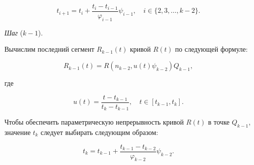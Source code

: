 $$
t_{i+1}=t_i+\frac{t_i-t_{i-1}}{\varphi_{i-1}}\psi_{i-1}, \quad i \in \{2,3,\dots,k-2\}.
$$

\bigskip
\textit{Шаг} ($k-1$).

Вычислим последний сегмент $R_{k-1}(t)$ кривой $R(t)$ по следующей формуле:

$$
R_{k-1}(t)=R(n_{k-2},u(t)\psi_{k-2})Q_{k-1},
$$

\noindent где

$$
u(t)=\frac{t-t_{k-1}}{t_k-t_{k-1}}, \quad t \in [t_{k-1},t_k].
$$

Чтобы обеспечить параметрическую непрерывность кривой $R(t)$ в точке $Q_{k-1}$, значение $t_k$ следует выбирать
следующим образом:

$$
t_k=t_{k-1}+\frac{t_{k-1}-t_{k-2}}{\varphi_{k-2}}\psi_{k-2}.
$$
